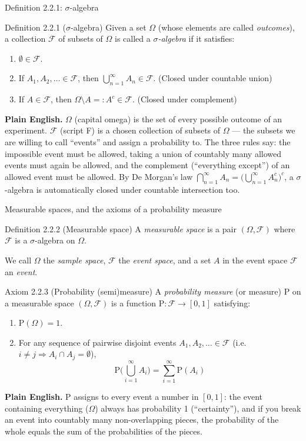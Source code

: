 \documentclass[aspectratio=169,10pt]{beamer}
\begin{document}
\begin{frame}{Definition 2.2.1: $\sigma$-algebra}
\begin{block}{Definition 2.2.1 ($\sigma$-algebra)}
Given a set $\Omega$ (whose elements are called \emph{outcomes}), a
collection $\mathcal{F}$ of subsets of $\Omega$ is called a
\emph{$\sigma$-algebra} if it satisfies:
\begin{enumerate}
\item $\emptyset \in \mathcal{F}$.
\item If $A_1,A_2,\ldots \in \mathcal{F}$, then $\bigcup_{n=1}^{\infty}A_n \in \mathcal{F}$. (Closed under countable union)
\item If $A \in \mathcal{F}$, then $\Omega\setminus A =: A^c \in \mathcal{F}$. (Closed under complement)
\end{enumerate}
\end{block}
\textbf{Plain English.} $\Omega$ (capital omega) is the set of every possible
outcome of an experiment. $\mathcal{F}$ (script F) is a chosen collection of
subsets of $\Omega$ --- the subsets we are willing to call ``events'' and
assign a probability to. The three rules say: the impossible event must be
allowed, taking a union of countably many allowed events must again be
allowed, and the complement (``everything except'') of an allowed event must
be allowed. By De Morgan's law $\bigcap_{n=1}^{\infty}A_n = \big(\bigcup_{n=1}^{\infty}A_n^c\big)^c$,
a $\sigma$-algebra is automatically closed under countable intersection too.
\end{frame}

\begin{frame}{Measurable spaces, and the axioms of a probability measure}
\begin{block}{Definition 2.2.2 (Measurable space)}
A \emph{measurable space} is a pair $(\Omega,\mathcal{F})$ where $\mathcal{F}$
is a $\sigma$-algebra on $\Omega$.
\end{block}
We call $\Omega$ the \emph{sample space}, $\mathcal{F}$ the \emph{event
space}, and a set $A$ in the event space $\mathcal{F}$ an \emph{event}.

\begin{block}{Axiom 2.2.3 (Probability (semi)measure)}
A \emph{probability measure} (or measure) $\mathrm{P}$ on a measurable space
$(\Omega,\mathcal{F})$ is a function $\mathrm{P}:\mathcal{F}\to[0,1]$
satisfying:
\begin{enumerate}
\item $\mathrm{P}(\Omega) = 1$.
\item For any sequence of pairwise disjoint events $A_1,A_2,\ldots \in \mathcal{F}$ (i.e.\ $i\neq j \Rightarrow A_i\cap A_j=\emptyset$),
\[ \mathrm{P}\Big(\bigcup_{i=1}^{\infty}A_i\Big) = \sum_{i=1}^{\infty}\mathrm{P}(A_i) \]
\end{enumerate}
\end{block}
\textbf{Plain English.} $\mathrm{P}$ assigns to every event a number in
$[0,1]$: the event containing everything ($\Omega$) always has probability 1
(``certainty''), and if you break an event into countably many
non-overlapping pieces, the probability of the whole equals the sum of the
probabilities of the pieces.
\end{frame}
\end{document}
